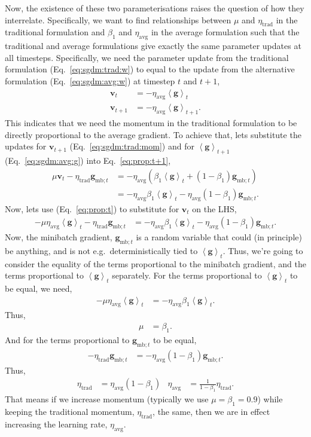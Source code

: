 \documentclass{article}
\newcommand{\bracket}[3]{\left#1 #3 \right#2}
\newcommand{\ab}{\bracket{\langle}{\rangle}}
\renewcommand{\b}{\bracket{(}{)}}
\newcommand{\0}{\mathbf{0}}
\newcommand{\g}{\mathbf{g}}
\newcommand{\mom}{\mathbf{v}}
\newcommand{\gmbt}{\g_{\text{mb}; t}}
\newcommand{\gb}{\mathbf{\ab{g}}}
\newcommand{\lrtrad}{\eta_\text{trad}}
\newcommand{\lravg}{\eta_\text{avg}}
\begin{document}
Now, the existence of these two parameterisations raises the question of how they interrelate.
Specifically, we want to find relationships between $\mu$ and $\lrtrad$ in the traditional formulation and $\beta_1$ and $\lravg$ in the average formulation such that the traditional and average formulations give exactly the same parameter updates at all timesteps.
Specifically, we need the parameter update from the traditional formulation (Eq.~\ref{eq:sgdm:trad:w}) to equal to the update from the alternative formulation (Eq.~\ref{eq:sgdm:avg:w}) at timestep $t$ and $t+1$,
\begin{subequations}
\begin{align}
  \label{eq:prop:t}
  \mom_{t} &= - \lravg \gb_{t} \\
  \label{eq:prop:t+1}
  \mom_{t+1} &= - \lravg \gb_{t+1}.
\end{align}
\end{subequations}
This indicates that we need the momentum in the traditional formulation to be directly proportional to the average gradient.
To achieve that, lets substitute the updates for $\mom_{t+1}$ (Eq.~\ref{eq:sgdm:trad:mom}) and for $\gb_{t+1}$ (Eq.~\ref{eq:sgdm:avg:g}) into Eq.~\eqref{eq:prop:t+1},
\begin{align}
  \nonumber
  \mu \mom_t - \lrtrad \gmbt &= - \lravg \b{\beta_1 \gb_t + (1-\beta_1) \gmbt} \\
  &= - \lravg \beta_1 \gb_t - \lravg (1-\beta_1) \gmbt.
\end{align}
Now, lets use (Eq.~\ref{eq:prop:t}) to substitute for $\mom_t$ on the LHS,
\begin{align}
  - \mu \lravg \gb_{t} - \lrtrad \gmbt &= - \lravg \beta_1 \gb_t - \lravg (1-\beta_1) \gmbt.
\end{align}
Now, the minibatch gradient, $\gmbt$ is a random variable that could (in principle) be anything, and is not e.g.\ deterministically tied to $\gb_t$.
Thus, we're going to consider the equality of the terms proportional to the minibatch gradient, and the terms proportional to $\gb_t$ separately.
For the terms proportional to $\gb_t$ to be equal, we need,
\begin{align}
  - \mu \lravg \gb_{t} &= - \lravg \beta_1 \gb_t.
\end{align}
Thus,
\begin{align}
  \mu &= \beta_1.
\end{align}
And for the terms proportional to $\gmbt$ to be equal,
\begin{align}
  - \lrtrad \gmbt &= - \lravg (1-\beta_1) \gmbt.
\end{align}
Thus,
\begin{align}
  \lrtrad &= \lravg (1-\beta_1) & 
  \lravg &= \tfrac{1}{1 -\beta_1} \lrtrad.
\end{align}
That means if we increase momentum (typically we use $\mu=\beta_1=0.9$) while keeping the traditional momentum, $\lrtrad$, the same, then we are in effect increasing the learning rate, $\lravg$.
\end{document}

